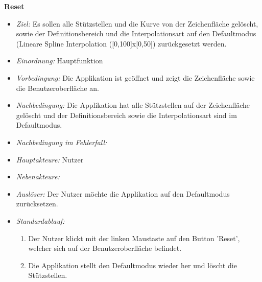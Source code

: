 \textbf{Reset}
  \begin{itemize}
  \item \textit{Ziel:} Es sollen alle St\"utzstellen und die Kurve von der Zeichenfl\"ache gel\"oscht, sowie der Definitionsbereich und die Interpolationsart auf den Defaultmodus (Lineare Spline Interpolation ([0,100]x[0,50]) zur\"uckgesetzt werden.
  \item \textit{Einordnung:} Hauptfunktion
  \item \textit{Vorbedingung:} Die Applikation ist ge\"offnet und zeigt die Zeichenfl\"ache sowie die Benutzeroberfl\"ache an.
  \item \textit{Nachbedingung:} Die Applikation hat alle St\"utzstellen auf der Zeichenfl\"ache gel\"oscht und der Definitionsbereich sowie die Interpolationsart sind im Defaultmodus.
  \item \textit{Nachbedingung im Fehlerfall:} 
  \item \textit{Hauptakteure:} Nutzer
  \item \textit{Nebenakteure:}
  \item \textit{Ausl\"oser:} Der Nutzer m\"ochte die Applikation auf den Defaultmodus zur\"ucksetzen.
  \item \textit{Standardablauf:}
    \begin{enumerate}[label=(\arabic*)]
    \item Der Nutzer klickt mit der linken Maustaste auf den Button 'Reset', welcher sich auf der Benutzeroberfl\"ache befindet.
    \item Die Applikation stellt den Defaultmodus wieder her und l\"oscht die St\"utzstellen.
    
    \end{enumerate}
 \end{itemize}